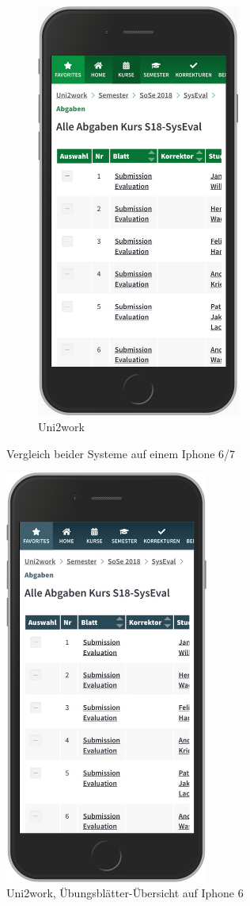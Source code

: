 \documentclass[11pt,a4paper,twoside,ngerman]{article}
\begin{document}
\begin{figure}
\begin{subfigure}{.5\textwidth}
      \includegraphics[width=67mm]{m_uni2work_sheets_green.jpg}
      \caption{Uni2work}
      \label{fig:sub2}
    \end{subfigure}
    \caption{Vergleich beider Systeme auf einem Iphone 6/7}
    \label{fig:mobile_comparison}
\end{figure}

\begin{figure}
    \centering
    \includegraphics[width=67mm]{m_uni2work_sheets_blue.jpg}
    \caption{Uni2work, Übungsblätter-Übersicht auf Iphone 6}
    \label{fig:uniworx_mobile}
\end{figure}
\end{document}
